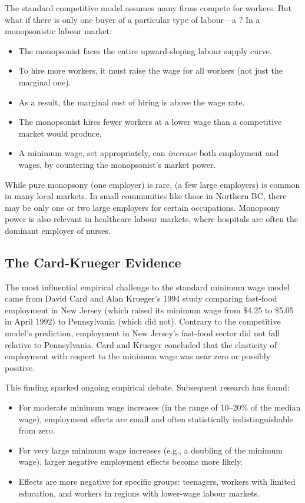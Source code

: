 The standard competitive model assumes many firms compete for workers. But what if there is only one buyer of a particular type of labour---a ? In a monopsonistic labour market:

\begin{itemize}
  \item The monopsonist faces the entire upward-sloping labour supply curve.
  \item To hire more workers, it must raise the wage for all workers (not just the marginal one).
  \item As a result, the marginal cost of hiring is above the wage rate.
  \item The monopsonist hires fewer workers at a lower wage than a competitive market would produce.
  \item A minimum wage, set appropriately, can \textit{increase} both employment and wages, by countering the monopsonist's market power.
\end{itemize}

While pure monopsony (one employer) is rare,  (a few large employers) is common in many local markets. In small communities like those in Northern BC, there may be only one or two large employers for certain occupations. Monopsony power is also relevant in healthcare labour markets, where hospitals are often the dominant employer of nurses.

\subsection{The Card-Krueger Evidence}

The most influential empirical challenge to the standard minimum wage model came from David Card and Alan Krueger's 1994 study comparing fast-food employment in New Jersey (which raised its minimum wage from \$4.25 to \$5.05 in April 1992) to Pennsylvania (which did not). Contrary to the competitive model's prediction, employment in New Jersey's fast-food sector did not fall relative to Pennsylvania. Card and Krueger concluded that the elasticity of employment with respect to the minimum wage was near zero or possibly positive.

This finding sparked ongoing empirical debate. Subsequent research has found:
\begin{itemize}
  \item For moderate minimum wage increases (in the range of 10--20\% of the median wage), employment effects are small and often statistically indistinguishable from zero.
  \item For very large minimum wage increases (e.g., a doubling of the minimum wage), larger negative employment effects become more likely.
  \item Effects are more negative for specific groups: teenagers, workers with limited education, and workers in regions with lower-wage labour markets.
\end{itemize}

